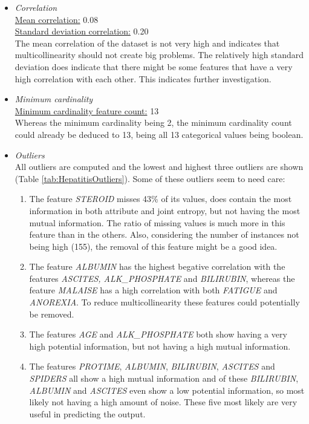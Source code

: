 \documentclass[10pt,a4paper]{report}
\begin{document}
	\begin{itemize}
		\item \textit{Correlation} \\
		\underline{Mean correlation:} 0.08 \\
		\underline{Standard deviation correlation:} 0.20 \\
		
		The mean correlation of the dataset is not very high and indicates that multicollinearity should not create big problems. The relatively high standard deviation does indicate that there might be some features that have a very high correlation with each other. This indicates further investigation.
		
		\item \textit{Minimum cardinality} \\
		\underline{Minimum cardinality feature count:} 13 \\
		
		Whereas the minimum cardinality being 2, the minimum cardinality count could already be deduced to 13, being all 13 categorical values being boolean.
		
		\item \textit{Outliers} \\
		
		All outliers are computed and the lowest and highest three outliers are shown (Table \ref{tab:HepatitisOutliers}). Some of these outliers seem to need care:
		\begin{enumerate}
			\item The feature \textit{STEROID} misses 43\% of its values, does contain the most information in both attribute and joint entropy, but not having the most mutual information. The ratio of missing values is much more in this feature than in the others. Also, considering the number of instances not being high (155), the removal of this feature might be a good idea.		
			\item The feature \textit{ALBUMIN} has the highest begative correlation with the features \textit{ASCITES, ALK\_PHOSPHATE} and \textit{BILIRUBIN},  whereas the feature \textit{MALAISE} has a high correlation with both \textit{FATIGUE} and \textit{ANOREXIA}. To reduce multicollinearity these features could potentially be removed.
			\item The features \textit{AGE} and \textit{ALK\_PHOSPHATE} both show having a very high potential information, but not having a high mutual information.
			\item The features \textit{PROTIME}, \textit{ALBUMIN}, \textit{BILIRUBIN}, \textit{ASCITES} and \textit{SPIDERS} all show a high mutual information and of these \textit{BILIRUBIN}, \textit{ALBUMIN} and \textit{ASCITES} even show a low potential information, so most likely not having a high amount of noise. These five most likely are very useful in predicting the output.
		\end{enumerate}	
		

\end{itemize}
\end{document}
